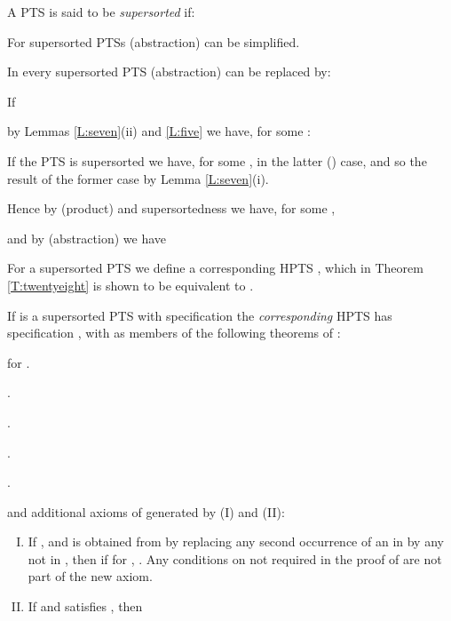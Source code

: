 \documentclass{LMCS}
\begin{document}
\begin{thm}
{\begin{defi}[Supersorted]\label{D:supers}

  A PTS is said to be \emph{supersorted} if:

\end{defi}

  For supersorted PTSs (abstraction) can be simplified.

\begin{thm}\label{T:sixteen} In every supersorted PTS
  (abstraction) can be replaced by:

\end{thm}

\proof If

  by Lemmas \ref{L:seven}(ii) and \ref{L:five} we have, for some
  :

  If the PTS is supersorted we have, for some ,  in the latter () case, and so the result of the
  former case by Lemma \ref{L:seven}(i).

  Hence by (product) and supersortedness we have, for some ,

  and by (abstraction) we have


  For a supersorted PTS  we define a corresponding HPTS
  , which in Theorem \ref{T:twentyeight} is shown to be
  equivalent to .

\begin{defi}\label{D:ssHPTS}

  If  is a supersorted PTS with specification  the \emph{corresponding} HPTS
   has specification , with as members of  the following
  theorems of :

 for .\hfill

.\hfill

.\hfill

.\hfill

\noindent{}\hfill 

\noindent{}\hfill

\noindent{}.\hfill

\noindent and additional axioms of  generated by (I) and
  (II):
\begin{enumerate}[(I)]
\item If ,  and  is
  obtained from  by replacing any second occurrence of an  in
   by any  not in , then if  for , . Any conditions on  not required in the proof of  are not
  part of the new axiom.
\item If  and  satisfies
  , then


\end{enumerate}
\end{defi}}
\end{thm}
\end{document}
